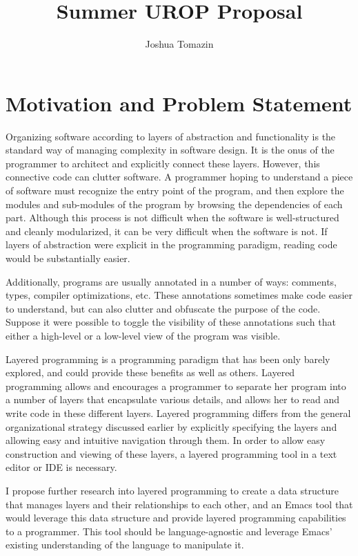 \documentclass[12pt]{article}
\author{Joshua Tomazin}
\date{}
\title{Summer UROP Proposal}
\begin{document}
\maketitle

\section*{Motivation and Problem Statement}
\label{sec:orgheadline1}
Organizing software according to layers of abstraction and functionality is the standard way of managing complexity in software design. It is the onus of the programmer to architect and explicitly connect these layers. However, this connective code can clutter software. A programmer hoping to understand a piece of software must recognize the entry point of the program, and then explore the modules and sub-modules of the program by browsing the dependencies of each part. Although this process is not difficult when the software is well-structured and cleanly modularized, it can be very difficult when the software is not. If layers of abstraction were explicit in the programming paradigm, reading code would be substantially easier.

Additionally, programs are usually annotated in a number of ways: comments, types, compiler optimizations, etc. These annotations sometimes make code easier to understand, but can also clutter and obfuscate the purpose of the code. Suppose it were possible to toggle the visibility of these annotations such that either a high-level or a low-level view of the program was visible.

Layered programming is a programming paradigm that has been only barely explored, and could provide these benefits as well as others. Layered programming allows and encourages a programmer to separate her program into a number of layers that encapsulate various details, and allows her to read and write code in these different layers. Layered programming differs from the general organizational strategy discussed earlier by explicitly specifying the layers and allowing easy and intuitive navigation through them. In order to allow easy construction and viewing of these layers, a layered programming tool in a text editor or IDE is necessary.

I propose further research into layered programming to create a data structure that manages layers and their relationships to each other, and an Emacs tool that would leverage this data structure and provide layered programming capabilities to a programmer. This tool should be language-agnostic and leverage Emacs' existing understanding of the language to manipulate it.
\end{document}
